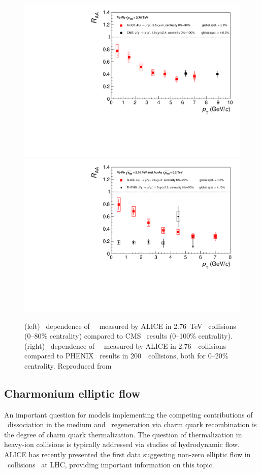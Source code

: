 \begin{figure}[h!]
\begin{center}
\includegraphics[width=0.49\linewidth,keepaspectratio]{qqbarfigures/RAAPtvsModels1.pdf}
\includegraphics[width=0.49\linewidth,keepaspectratio]{qqbarfigures/RAAPtvsModels2.pdf}
\caption{ \label{fig:GR:raaexp2}
(left) \pT\ dependence of \jpsi\ \Raa\ measured by ALICE in 2.76~TeV \PbPb\
collisions (0--80\% centrality) compared to CMS~\cite{Chatrchyan:2012np}
results (0--100\% centrality).
(right) \pT\ dependence of \jpsi\ \Raa\ measured by ALICE 
in 2.76\TeV\ \PbPb\ collisions compared to PHENIX~\cite{Adare:2011yf}
results in 200\GeV\ \AuAu\ collisions, both for 0--20\% centrality.  Reproduced from~\cite{Abelev:2013ila}}
\end{center}
\end{figure}


\subsection{Charmonium elliptic flow}

An important question for models implementing the competing contributions of
\jpsi\ dissociation in the medium and \jpsi\ regeneration via charm quark recombination is
the degree of charm quark thermalization. The question of thermalization in heavy-ion 
collisions is typically addressed via studies of hydrodynamic flow. 
ALICE has recently presented the first data 
suggesting non-zero elliptic flow in \PbPb\ collisions~\cite{ALICE:2013xna} at LHC, 
providing important information on this topic.


